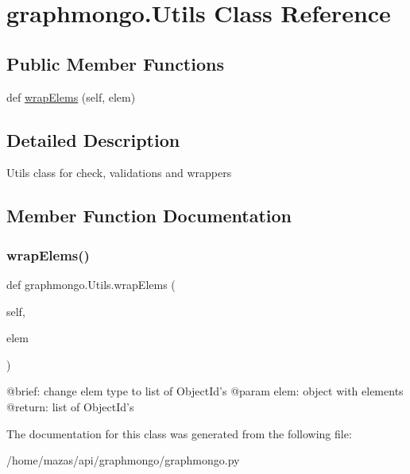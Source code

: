\hypertarget{classgraphmongo_1_1Utils}{}\section{graphmongo.\+Utils Class Reference}
\label{classgraphmongo_1_1Utils}
\subsection*{Public Member Functions}
\begin{DoxyCompactItemize}
\item 
def \hyperlink{classgraphmongo_1_1Utils_ac2f4fcdf9f82ea6f876e092d2a7375fc}{wrap\+Elems} (self, elem)
\end{DoxyCompactItemize}


\subsection{Detailed Description}
\begin{DoxyVerb}Utils class for check, validations and wrappers
\end{DoxyVerb}
 

\subsection{Member Function Documentation}
\hypertarget{classgraphmongo_1_1Utils_ac2f4fcdf9f82ea6f876e092d2a7375fc}{}\label{classgraphmongo_1_1Utils_ac2f4fcdf9f82ea6f876e092d2a7375fc} 
\subsubsection{\texorpdfstring{wrap\+Elems()}{wrapElems()}}
{\footnotesize\ttfamily def graphmongo.\+Utils.\+wrap\+Elems (\begin{DoxyParamCaption}\item[{}]{self,  }\item[{}]{elem }\end{DoxyParamCaption})}

\begin{DoxyVerb}@brief: change elem type to list of ObjectId's
@param elem: object with elements
@return: list of ObjectId's 
\end{DoxyVerb}
 

The documentation for this class was generated from the following file\+:\begin{DoxyCompactItemize}
\item 
/home/mazas/api/graphmongo/graphmongo.\+py\end{DoxyCompactItemize}
